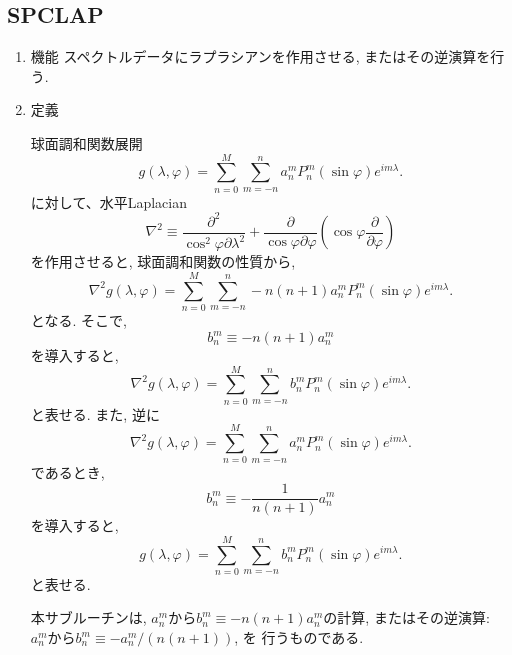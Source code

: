 \documentclass[a4j,fleqn]{jarticle}
\begin{document}

\subsection{SPCLAP}

\begin{enumerate}

\item 機能 
スペクトルデータにラプラシアンを作用させる, またはその逆演算を行う.

\item 定義

球面調和関数展開
\begin{equation}
g(\lambda,\varphi)=\sum^M_{n=0}\sum^n_{m=-n}
a^m_nP^m_n(\sin\varphi)e^{im\lambda}.
\end{equation}
に対して、水平Laplacian
\begin{equation}
\nabla^2\equiv
\frac{\partial^2}{\cos^2\varphi\partial\lambda^2}
+\frac{\partial}{\cos\varphi\partial\varphi}\left(\cos\varphi\frac{\partial}{\partial\varphi}\right)
\end{equation}
を作用させると, 球面調和関数の性質から, 
\begin{equation}
\nabla^2 g(\lambda,\varphi)
=\sum^M_{n=0}\sum^n_{m=-n}-n(n+1)a^m_nP^m_n(\sin\varphi)e^{im\lambda}.
\end{equation}
となる. そこで,
\begin{equation}
b^m_n\equiv -n(n+1)a^m_n
\end{equation}
を導入すると, 
\begin{equation}
\nabla^2 g(\lambda,\varphi)
=\sum^M_{n=0}\sum^n_{m=-n}b^m_nP^m_n(\sin\varphi)e^{im\lambda}.
\end{equation}
と表せる. 
また, 逆に
\begin{equation}
\nabla^2 g(\lambda,\varphi)
=\sum^M_{n=0}\sum^n_{m=-n}a^m_nP^m_n(\sin\varphi)e^{im\lambda}.
\end{equation}
であるとき, 
\begin{equation}
b^m_n\equiv -\frac1{n(n+1)}a^m_n
\end{equation}
を導入すると, 
\begin{equation}
g(\lambda,\varphi)
=\sum^M_{n=0}\sum^n_{m=-n}b^m_nP^m_n(\sin\varphi)e^{im\lambda}.
\end{equation}
と表せる. 

本サブルーチンは,
$a^m_n$から$b^m_n\equiv -n(n+1)a^m_n$の計算, 
またはその逆演算: $a^m_n$から$b^m_n\equiv -a^m_n/(n(n+1))$, を
行うものである. 


\end{enumerate}
\end{document}

